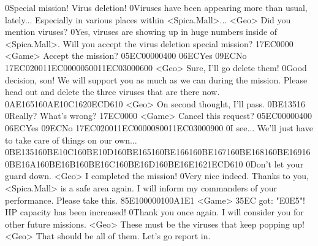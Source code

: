 0Special mission! Virus deletion! 
0Viruses have been appearing more than usual, lately... 
Especially in various places within <Spica.Mall>... 
<Geo> Did you mention viruses? 
0Yes, viruses are showing up in huge numbers inside of <Spica.Mall>. 
Will you accept the virus deletion special mission? 
{17}{EC}{00}{00} 
<Game> Accept the mission? {05}{EC}{00}{00}{04}{00}  {06}{EC}Yes   {09}{EC}No 
{17}{EC}{02}{00}{11}{EC}{00}{00}{05}{00}{11}{EC}{03}{00}{06}{00}
<Geo> Sure, I'll go delete them! 
0Good decision, son! 
We will support you as much as we can during the mission. 
Please head out and delete the three viruses that are there now. 
{0A}{E1}{65}{16}{0A}{E1}{0C}{16}{20}{EC}{D6}{10}
<Geo> On second thought, I'll pass. 
{0B}{E1}{35}{16}
0Really? What's wrong? 
{17}{EC}{00}{00} 
<Game> Cancel this request? {05}{EC}{00}{00}{04}{00}  {06}{EC}Yes   {09}{EC}No 
{17}{EC}{02}{00}{11}{EC}{00}{00}{08}{00}{11}{EC}{03}{00}{09}{00}
0I see... 
We'll just have to take care of things on our own... 
{0B}{E1}{35}{16}{0B}{E1}{0C}{16}{0B}{E1}{0D}{16}{0B}{E1}{65}{16}{0B}{E1}{66}{16}{0B}{E1}{67}{16}{0B}{E1}{68}{16}{0B}{E1}{69}{16}{0B}{E1}{6A}{16}{0B}{E1}{6B}{16}{0B}{E1}{6C}{16}{0B}{E1}{6D}{16}{0B}{E1}{6E}{16}{21}{EC}{D6}{10}
0Don't let your guard down. 
<Geo> I completed the mission! 
0Very nice indeed. 
Thanks to you, <Spica.Mall> is a safe area again. 
I will inform my commanders of your performance. 
Please take this. 
{85}{E1}{00}{00}{01}{00}{A1}{E1} 
<Game> {35}{EC} got: "{E0}{E5}"! 
HP capacity has been increased! 
0Thank you once again. 
I will consider you for other future missions. 
<Geo> These must be the viruses that keep popping up! 
<Geo> That should be all of them. Let's go report in. 
